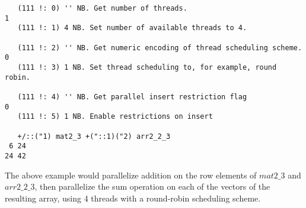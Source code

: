 \begin{singlespacing}
\begin{small}
\begin{verbatim}
   (111 !: 0) '' NB. Get number of threads.
1
   (111 !: 1) 4 NB. Set number of available threads to 4.

   (111 !: 2) '' NB. Get numeric encoding of thread scheduling scheme.
0
   (111 !: 3) 1 NB. Set thread scheduling to, for example, round robin.

   (111 !: 4) '' NB. Get parallel insert restriction flag
0
   (111 !: 5) 1 NB. Enable restrictions on insert

   +/::("1) mat2_3 +("::1)("2) arr2_2_3
 6 24
24 42
\end{verbatim}
\end{small}
\end{singlespacing}

The above example would parallelize addition on the row elements of $mat2\_3$ and $arr2\_2\_3$,
then parallelize the sum operation on each of the vectors of the resulting array, 
using 4 threads with a round-robin scheduling scheme.

